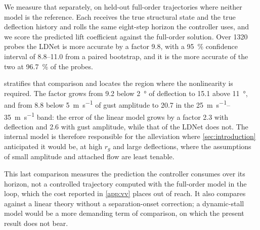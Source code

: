 We measure that separately, on held-out full-order trajectories where
neither model is the reference. Each receives the true structural state and
the true deflection history and rolls the same eight-step horizon the
controller uses, and we score the predicted lift coefficient against the
full-order solution. Over \num{1320} probes the LDNet is more accurate by a
factor \num{9.8}, with a \SI{95}{\percent} confidence interval of
\numrange{8.8}{11.0} from a paired bootstrap, and it is the more accurate of
the two at \SI{96.7}{\percent} of the probes.

 stratifies that comparison and locates the region
where the nonlinearity is required. The factor grows from \num{9.2} below
\SI{2}{\degree} of deflection to \num{15.1} above \SI{11}{\degree}, and
from \num{8.8} below \SI{5}{\meter\per\second} of gust amplitude to
\num{20.7} in the \SIrange{25}{35}{\meter\per\second} band: the error of
the linear model grows by a factor \num{2.3} with deflection and \num{2.6}
with gust amplitude, while that of the LDNet does not. The internal model
is therefore responsible for the alleviation where
\cref{sec:introduction} anticipated it would be, at high $r_g$ and large
deflections, where the assumptions of small amplitude and attached flow are
least tenable.

This last comparison measures the prediction the controller consumes over
its horizon, not a controlled trajectory computed with the full-order model
in the loop, which the cost reported in \cref{app:vv} places out of reach.
It also compares against a linear theory without a separation-onset
correction; a dynamic-stall model would be a more demanding term of
comparison, on which the present result does not bear.

